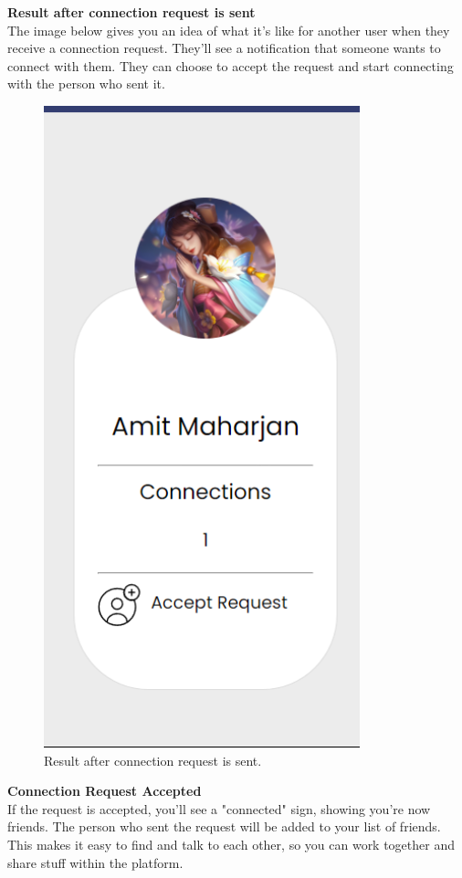 \textbf{Result after connection request is sent}
\\The image below gives you an idea of what it's like for another user when they receive a connection request. They'll see a notification that someone wants to connect with them. They can choose to accept the request and start connecting with the person who sent it. 
\begin{figure}[ht]
    \centering
    \includegraphics[height=0.3\textheight]{Outcome-ss/accept-request.png}
    \caption{Result after connection request is sent.}
    \label{fig:Result after connection request is sent}
\end{figure}
\newpage
\textbf{Connection Request Accepted}
\\If the request is accepted, you'll see a "connected" sign, showing you're now friends. The person who sent the request will be added to your list of friends. This makes it easy to find and talk to each other, so you can work together and share stuff within the platform.
